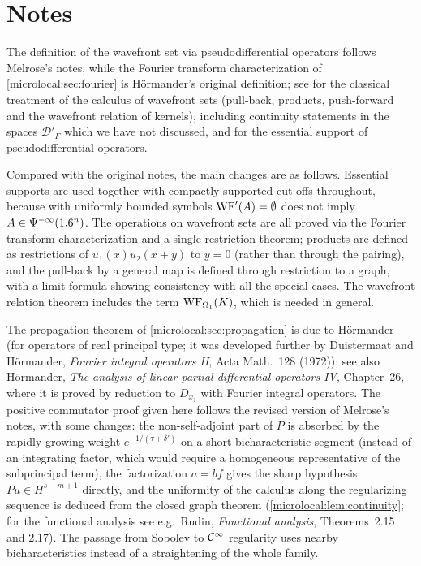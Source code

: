 \section*{Notes}
The definition of the wavefront set via pseudodifferential operators
follows Melrose's notes, while the Fourier transform characterization of
\cref{microlocal:sec:fourier} is H\"ormander's original definition; see
\cite[Chapter~8]{Hormander-I} for the classical treatment of the calculus of
wavefront sets (pull-back, products, push-forward and the wavefront relation
of kernels), including continuity statements in the spaces
$\mathcal D'_\Gamma$ which we have not discussed, and \cite[Chapter~18]{Hormander-III}
for the essential support of pseudodifferential operators.

Compared with the original notes, the main changes are as follows. Essential
supports are used together with compactly supported cut-offs throughout,
because with uniformly bounded symbols $\operatorname{WF}'(A)=\emptyset$ does not imply
$A\in\Psi^{-\infty}(1.6^n)$. The operations on wavefront sets are all proved
via the Fourier transform characterization and a single restriction theorem;
products are defined as restrictions of $u_1(x)u_2(x+y)$ to $y=0$ (rather than
through the pairing), and the pull-back by a general map is defined through
restriction to a graph, with a limit formula showing consistency with all
the special cases. The wavefront relation theorem includes the term
$\operatorname{WF}_{\Omega_1}(K)$, which is needed in general.

The propagation theorem of \cref{microlocal:sec:propagation} is due to
H\"ormander (for operators of real principal type; it was developed further by
Duistermaat and H\"ormander, \emph{Fourier integral operators II}, Acta
Math.\ 128 (1972)); see also H\"ormander, \emph{The analysis of linear partial
differential operators IV}, Chapter~26, where it is proved by reduction to
$D_{x_1}$ with Fourier integral operators. The positive commutator proof given
here follows the revised version of Melrose's notes, with some changes: the
non-self-adjoint part of $P$ is absorbed by the rapidly growing weight
$e^{-1/(\tau+\delta')}$ on a short bicharacteristic segment (instead of an
integrating factor, which would require a homogeneous representative of the
subprincipal term), the factorization $a=bf$ gives the sharp hypothesis
$Pu\in H^{s-m+1}$ directly, and the uniformity of the calculus along the
regularizing sequence is deduced from the closed graph theorem
(\cref{microlocal:lem:continuity}; for the functional analysis see e.g.\
Rudin, \emph{Functional analysis}, Theorems~2.15 and 2.17). The passage from
Sobolev to $\mathcal{C}^\infty$ regularity uses nearby bicharacteristics instead of a
straightening of the whole family.
